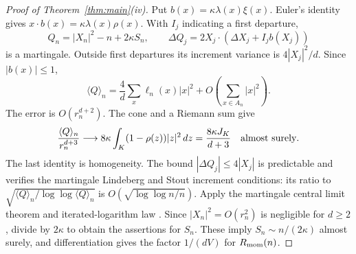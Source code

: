 \begin{proof}[Proof of Theorem~\ref{thm:main}\textup{(iv)}]
Put $b(x)=\kappa\lambda(x)\xi(x)$. Euler's identity gives $x\cdot b(x)=\kappa\lambda(x)\rho(x)$.
With $I_j$ indicating a first departure,
\[
 Q_n=|X_n|^2-n+2\kappa S_n,\qquad
 \Delta Q_j=2X_j\cdot(\Delta X_j+I_jb(X_j))
\]
is a martingale. Outside first departures its increment variance
is $4|X_j|^2/d$. Since $|b(x)|\leq1$,
\[
 \langle Q\rangle_n=\frac4d\sum_x\ell_n(x)|x|^2
             +O\!\left(\sum_{x\in A_n}|x|^2\right).
\]
The error is $O(r_n^{d+2})$. The cone and a Riemann sum give
\[
 \frac{\langle Q\rangle_n}{r_n^{d+3}}
 \longrightarrow8\kappa\int_{K}(1-\rho(z))|z|^2\,dz
       =\frac{8\kappa J_K}{d+3}\quad\hbox{almost surely}.
\]
The last identity is homogeneity. The bound
$|\Delta Q_j|\leq4|X_j|$ is predictable and verifies the
martingale Lindeberg and Stout increment conditions: its ratio to
$\sqrt{\langle Q\rangle_n/\log\log\langle Q\rangle_n}$ is
$O(\sqrt{\log\log n/n})$. Apply the martingale central limit theorem
\citep[Corollary~3.1]{HallHeyde1980} and iterated-logarithm law
\citep{Stout1970}.
Since $|X_n|^2=O(r_n^2)$ is negligible for $d\geq2$, divide by
$2\kappa$ to obtain the assertions for $S_n$.
These imply $S_n\sim n/(2\kappa)$ almost surely, and
differentiation gives the factor $1/(dV)$ for $R_{\mathrm{mom}}(n)$.
\end{proof}

